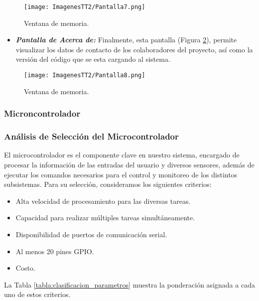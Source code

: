 \documentclass[14pt,oneside]{extarticle} %
\begin{document}
\begin{figure}[h!]
    \centering
    \texttt{[image: ImagenesTT2/Pantalla7.png]}
    \caption{Ventana de memoria.}
    \label{fig:Pantalla7}
\end{figure}

\begin{itemize}
    \item \textit{\textbf{Pantalla de Acerca de:}} Finalmente, esta pantalla (Figura \ref{fig:Pantalla8}), permite visualizar los datos de contacto de los colaboradores del proyecto, así como la versión del código que se esta cargando al sistema. 
\end{itemize}

\begin{figure}[h!]
    \centering
    \texttt{[image: ImagenesTT2/Pantalla8.png]}
    \caption{Ventana de memoria.}
    \label{fig:Pantalla8}
\end{figure}

\subsubsection{Microncontrolador}

\subsubsection{Análisis de Selección del Microcontrolador}

El microcontrolador es el componente clave en nuestro sistema, encargado de procesar la información de las entradas del usuario y diversos sensores, además de ejecutar los comandos necesarios para el control y monitoreo de los distintos subsistemas. Para su selección, consideramos los siguientes criterios:

\newpage

\begin{itemize}
    \item Alta velocidad de procesamiento para las diversas tareas.
    \item Capacidad para realizar múltiples tareas simultáneamente.
    \item Disponibilidad de puertos de comunicación serial.
    \item Al menos 20 pines GPIO.
    \item Costo.
\end{itemize}

La Tabla \ref{tabla:clasificacion_parametros} muestra la ponderación asignada a cada uno de estos criterios.
\end{document}
